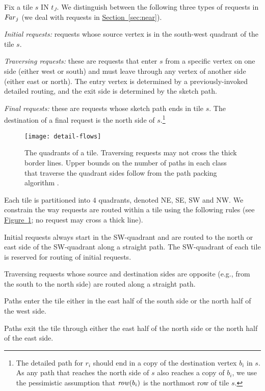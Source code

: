 \documentclass[11pt]{article}
\newcommand{\namedref}[2]{\hyperref[#2]{#1~\ref*{#2}}}
\newcommand{\sectionref}[1]{\namedref{Section}{#1}}
\newcommand{\figureref}[1]{\namedref{Figure}{#1}}
\newcommand{\route}{\text{\sc{ipp}}\xspace}
\newcommand{\IPP}{\route}
\newenvironment{proof sketch}[1]{\noindent {\emph{Proof sketch of #1:}}}{\hfill \qed}
\newcommand{\row}{\text{\emph{row}}\xspace}
\newcommand{\far}{\text{\emph{Far}}\xspace}
\newcommand{\near}{\text{\emph{Near}}\xspace}
\begin{document}
Fix a tile $s$ IN $t_J$. We distinguish between the following three types of requests in
$\far_j$ (we deal with \near requests in \sectionref{sec:near}).
\begin{compactitem}
\item \emph{Initial requests:} requests whose source vertex is in the
  south-west
  quadrant of the tile $s$.
\item \emph{Traversing requests:} these are requests that enter $s$ from a
  specific vertex on one side (either west or south) and must leave
  through any vertex of another side (either east or north).  The
  entry vertex is determined by a previously-invoked detailed routing,
  and the exit side is determined by the sketch path.
\item \emph{Final requests:} these are requests whose sketch path ends in
  tile $s$.  The destination of a final request is the north side of
  $s$.\footnote{The detailed path for $r_i$ should end in a copy of the
    destination vertex $b_i$ in $s$. As any path that reaches the
    north side of $s$ also reaches a copy of $b_i$, we use the
    pessimistic assumption that $\row(b_i)$ is the northmost row of
    tile $s$.}
\end{compactitem}

    \begin{figure}
      \centering
        \texttt{[image: detail-flows]}
        \caption{The quadrants of a tile. Traversing requests may not cross the thick
          border lines. Upper bounds on the number of paths in each class that
          traverse the quadrant sides follow from the path packing algorithm \IPP. }
      \label{fig:detail}
    \end{figure}

Each tile is partitioned into $4$ quadrants,
denoted NE, SE, SW and NW.  We constrain the way requests are routed
within a tile
using the following rules (see \figureref{fig:detail}; no request
may cross a thick line).

\begin{compactenum}
\item Initial requests always start in the SW-quadrant and are routed to the north or
  east side of the SW-quadrant along a straight path.  The SW-quadrant
  of each tile is reserved for routing of initial requests.
\item Traversing requests whose source and destination sides are
  opposite (e.g., from the south to the north side) are routed along a
  straight path.
\item Paths enter the tile either in the
  east half of the
  south side or the north half of the west side.
\item Paths exit the tile through either the east half of the north side or the
  north half of the east side.
\end{compactenum}
\end{document}
